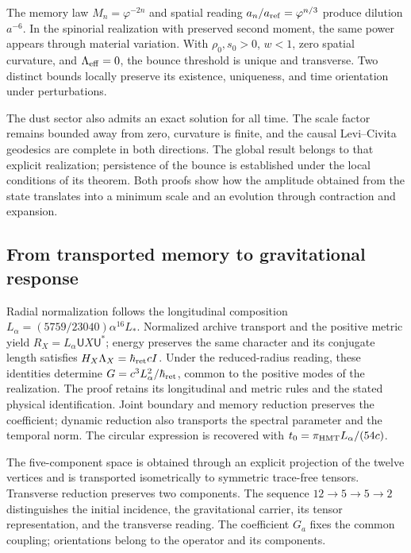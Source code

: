 The memory law \(M_n=\varphi^{-2n}\) and spatial reading
\(a_n/a_{\rm ref}=\varphi^{n/3}\) produce dilution
\(a^{-6}\). In the spinorial realization with preserved second
moment, the same power appears through material variation.
With \(\rho_0,s_0>0\), \(w<1\), zero spatial curvature, and
\(\Lambda_{\rm eff}=0\), the bounce threshold is unique and
transverse. Two distinct bounds locally preserve its
existence, uniqueness, and time orientation under perturbations.

The dust sector also admits an exact solution for all
time. The scale factor remains bounded away from zero,
curvature is finite, and the causal Levi--Civita geodesics
are complete in both directions. The global result belongs
to that explicit realization; persistence of the bounce is
established under the local conditions of its theorem. Both
proofs show how the amplitude obtained from the state translates
into a minimum scale and an evolution through contraction and expansion.

\subsection{From transported memory to gravitational response}

Radial normalization follows the longitudinal composition
\(L_\alpha=(5759/23040)\alpha^{16}L_*\). Normalized archive transport
and the positive metric yield
\(R_X=L_\alpha\mathsf U X\mathsf U^*\); energy preserves the same
character and its conjugate length satisfies
\(H_X\Lambda_X=\hbar_{\rm ret}cI\). Under the reduced-radius reading,
these identities determine \(G=c^3L_\alpha^2/\hbar_{\rm ret}\), common
to the positive modes of the realization. The proof retains its
longitudinal and metric rules and the stated physical identification.
Joint boundary and memory reduction preserves the coefficient; dynamic
reduction also transports the spectral parameter and the temporal norm.
The circular expression is recovered with
\(t_0=\pi_{\rm HMT}L_\alpha/(54c)\).

The five-component space is obtained through an explicit projection
of the twelve vertices and is transported isometrically to symmetric
trace-free tensors. Transverse reduction preserves two components.
The sequence \(12\to5\to5\to2\) distinguishes the initial incidence,
the gravitational carrier, its tensor representation, and the transverse
reading. The coefficient \(G_a\) fixes the common coupling;
orientations belong to the operator and its components.

